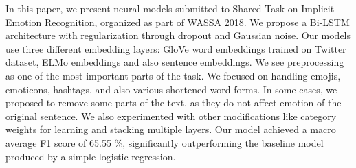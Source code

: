 In this paper, we present neural models submitted to Shared Task on Implicit Emotion Recognition, organized as part of WASSA 2018. We propose a Bi-LSTM architecture with regularization through dropout and Gaussian noise. Our models use three different embedding layers: GloVe word embeddings trained on Twitter dataset, ELMo embeddings and also sentence embeddings. We see preprocessing as one of the most important parts of the task. We focused on handling emojis, emoticons, hashtags, and also various shortened word forms. In some cases, we proposed to remove some parts of the text, as they do not affect emotion of the original sentence. We also experimented with other modifications like category weights for learning and stacking multiple layers.  Our model achieved a macro average F1 score of 65.55 \%, significantly outperforming the baseline model produced by a simple logistic regression.
